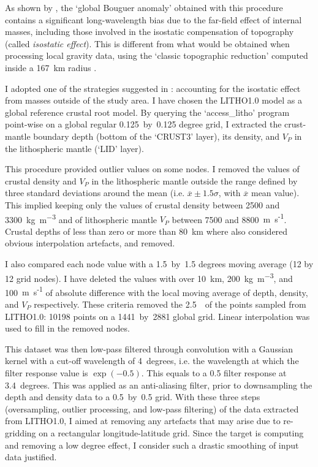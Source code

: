 As shown by \textcite{Szwillus2016}, the `global Bouguer anomaly' obtained with this procedure contains a significant long-wavelength bias due to the far-field effect of internal masses, including those involved in the isostatic compensation of topography (called \textit{isostatic effect}).
This is different from what would be obtained when processing local gravity data, using the `classic topographic reduction' computed inside a 167~\si{\kilo \metre} radius \parencite{hayford1912}.

I adopted one of the strategies suggested in \textcite{Szwillus2016}: accounting for the isostatic effect from masses outside of the study area.
I have chosen the {LITHO1.0} model \parencite{Pasyanos2014} as a global reference crustal root model.
By querying the `{access\_litho}' program point-wise on a global regular {0.125}~by~{0.125} degree grid, I extracted the crust-mantle boundary depth (bottom of the `CRUST3' layer), its density, and $V_P$ in the lithospheric mantle (`LID' layer).

This procedure provided outlier values on some nodes.
I removed the values of crustal density and $V_P$ in the lithospheric mantle outside the range defined by three standard deviations around the mean (i.e. $\overline{x} \pm 1.5 \sigma $, with $\overline{x}$ mean value).
This implied keeping only the values of crustal density between 2500 and 3300~\si{\kilo \gram \per \cubic \metre} and of lithospheric mantle $V_P$ between 7500 and 8800~{m~s\textsuperscript{-1}}.
Crustal depths of less than zero or more than 80~\si{\kilo \metre} where also considered obvious interpolation artefacts, and removed.

I also compared each node value with a {1.5}~by~{1.5} degrees moving average (12 by 12 grid nodes). I have deleted the values with over 10~\si{\kilo \metre}, 200~\si{\kilo \gram \per \cubic \metre}, and 100~{m~s\textsuperscript{-1}} of absolute difference with the local moving average of depth, density, and $V_P$ respectively.
These criteria removed the {2.5}~\textperthousand~of the points sampled from {LITHO1.0}: 10198 points on a 1441~by~2881 global grid.
Linear interpolation was used to fill in the removed nodes.

This dataset was then low-pass filtered through convolution with a Gaussian kernel with a cut-off wavelength of 4~degrees, i.e. the wavelength at which the filter response value is $\exp(-0.5)$.
This equals to a {0.5} filter response at {3.4}~degrees.
This was applied as an anti-aliasing filter, prior to downsampling the depth and density data to a {0.5}~by~{0.5} grid.
With these three steps (oversampling, outlier processing, and low-pass filtering) of the data extracted from {LITHO1.0}, I aimed at removing any artefacts that may arise due to re-gridding on a rectangular longitude-latitude grid.
Since the target is computing and removing a low degree effect, I consider such a drastic smoothing of input data justified.

